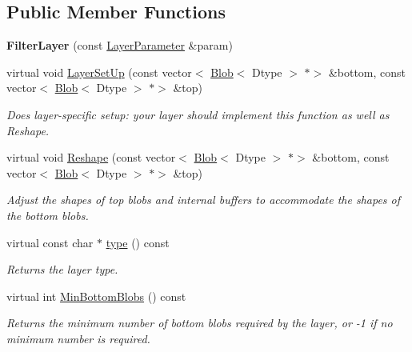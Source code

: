 \subsection*{Public Member Functions}
\begin{DoxyCompactItemize}
\item 
\mbox{\label{classcaffe_1_1_filter_layer_a7384a8e15c84b16b46b775a11b95cc4f}} 
{\bfseries Filter\+Layer} (const \mbox{\hyperlink{classcaffe_1_1_layer_parameter}{Layer\+Parameter}} \&param)
\item 
virtual void \mbox{\hyperlink{classcaffe_1_1_filter_layer_a26a302fd9629af812e7d0714db79bb53}{Layer\+Set\+Up}} (const vector$<$ \mbox{\hyperlink{classcaffe_1_1_blob}{Blob}}$<$ Dtype $>$ $\ast$$>$ \&bottom, const vector$<$ \mbox{\hyperlink{classcaffe_1_1_blob}{Blob}}$<$ Dtype $>$ $\ast$$>$ \&top)
\begin{DoxyCompactList}\small\item\em Does layer-\/specific setup\+: your layer should implement this function as well as Reshape. \end{DoxyCompactList}\item 
virtual void \mbox{\hyperlink{classcaffe_1_1_filter_layer_ade673aa44e466adbe3aa79531a7c7484}{Reshape}} (const vector$<$ \mbox{\hyperlink{classcaffe_1_1_blob}{Blob}}$<$ Dtype $>$ $\ast$$>$ \&bottom, const vector$<$ \mbox{\hyperlink{classcaffe_1_1_blob}{Blob}}$<$ Dtype $>$ $\ast$$>$ \&top)
\begin{DoxyCompactList}\small\item\em Adjust the shapes of top blobs and internal buffers to accommodate the shapes of the bottom blobs. \end{DoxyCompactList}\item 
\mbox{\label{classcaffe_1_1_filter_layer_ade903bde57d67d6980b1608bf146fd30}} 
virtual const char $\ast$ \mbox{\hyperlink{classcaffe_1_1_filter_layer_ade903bde57d67d6980b1608bf146fd30}{type}} () const
\begin{DoxyCompactList}\small\item\em Returns the layer type. \end{DoxyCompactList}\item 
virtual int \mbox{\hyperlink{classcaffe_1_1_filter_layer_af4c97961e859653ef0fa21d796af0259}{Min\+Bottom\+Blobs}} () const
\begin{DoxyCompactList}\small\item\em Returns the minimum number of bottom blobs required by the layer, or -\/1 if no minimum number is required. \end{DoxyCompactList}\item 

\end{DoxyCompactItemize}
